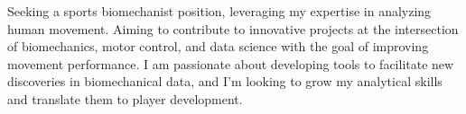 \small{
Seeking a sports biomechanist position, leveraging my expertise in analyzing human movement. Aiming to contribute to innovative projects at the intersection of biomechanics, motor control, and data science with the goal of improving movement performance. I am passionate about developing tools to facilitate new discoveries in biomechanical data, and I'm looking to grow my analytical skills and translate them to player development.
}